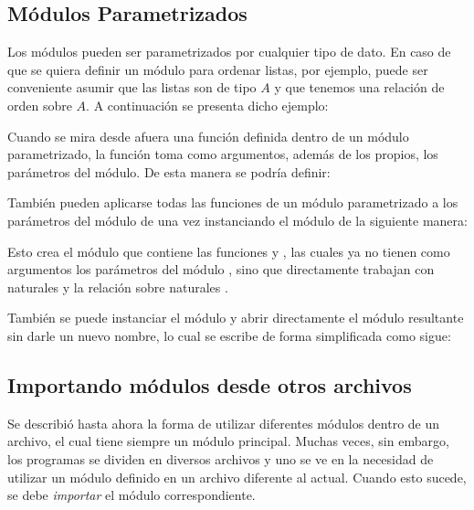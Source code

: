 
\subsection{Módulos Parametrizados}\label{modules:parametrized}

Los módulos pueden ser parametrizados por cualquier tipo de dato. En caso de que se quiera definir un módulo para ordenar listas, por ejemplo, puede ser conveniente asumir que las listas son de tipo $A$ y que tenemos una relación de orden sobre $A$. A continuación se presenta dicho ejemplo: 




Cuando se mira desde afuera una función definida dentro de un módulo parametrizado, la función toma como argumentos, además de los propios, los parámetros del módulo. De esta manera se podría definir:




También pueden aplicarse todas las funciones de un módulo parametrizado a los parámetros del módulo de una vez instanciando el módulo de la siguiente manera: 




Esto crea el módulo  que contiene las funciones  y , las cuales ya no tienen como argumentos los parámetros del módulo , sino que directamente trabajan con naturales y la relación sobre naturales \AgdaFunction{<}. 




También se puede instanciar el módulo y abrir directamente el módulo resultante sin darle un nuevo nombre, lo cual se escribe de forma simplificada como sigue:




\subsection{Importando módulos desde otros archivos}\label{modules:files}

Se describió hasta ahora la forma de utilizar diferentes módulos dentro de un archivo, el cual tiene siempre un módulo principal. Muchas veces, sin embargo, los programas se dividen en diversos archivos y uno se ve en la necesidad de utilizar un módulo definido en un archivo diferente al actual. Cuando esto sucede, se debe \textit{importar} el módulo correspondiente.  

